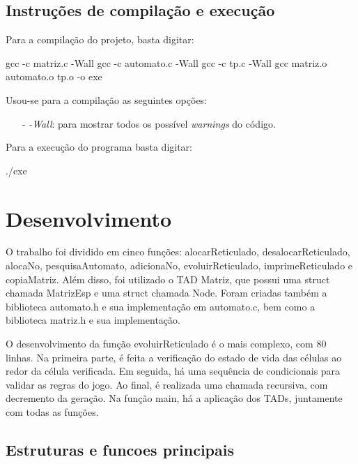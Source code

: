 \documentclass{article}
\begin{document}
\subsection{Instruções de compilação e execução}

Para a compilação do projeto, basta digitar:

\begin{tcolorbox}[title=Compilando o projeto,width=\linewidth]
    gcc -c matriz.c -Wall
    gcc -c automato.c -Wall
    gcc -c tp.c -Wall
    gcc matriz.o automato.o tp.o -o exe
\end{tcolorbox}

Usou-se para a compilação as seguintes opções:
\begin{itemize}
    \item [-] \emph{-Wall}: para mostrar todos os possível \emph{warnings} do código.
\end{itemize}

Para a execução do programa basta digitar:
\begin{tcolorbox}[title=,width=\linewidth]
    ./exe
\end{tcolorbox}


\clearpage
\section{Desenvolvimento}

\noindent O trabalho foi dividido em cinco funções: alocarReticulado, desalocarReticulado, alocaNo, pesquisaAutomato, adicionaNo, evoluirReticulado, imprimeReticulado e copiaMatriz. Além disso, foi utilizado o TAD Matriz, que possui uma struct chamada MatrizEsp e uma struct chamada Node. Foram criadas também a biblioteca automato.h e sua implementação em automato.c, bem como a biblioteca matriz.h e sua implementação.

O desenvolvimento da função evoluirReticulado é o mais complexo, com 80 linhas. Na primeira parte, é feita a verificação do estado de vida das células ao redor da célula verificada. Em seguida, há uma sequência de condicionais para validar as regras do jogo. Ao final, é realizada uma chamada recursiva, com decremento da geração. Na função main, há a aplicação dos TADs, juntamente com todas as funções.


\subsection{Estruturas e funcoes principais}
\end{document}
